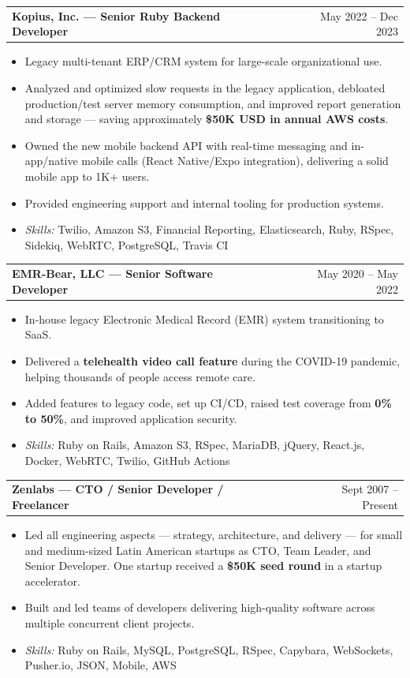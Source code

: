 \documentclass[a4paper,12pt]{article}
\makeatletter
\newcommand{\skillsfont}{\fontsize{9.6}{11.5}\selectfont}
\newenvironment{joblong}[2]
    {
    \begin{tabularx}{\linewidth}{@{}l X r@{}}
    \textbf{#1} & \hfill &  #2 \\[3.75pt]
    \end{tabularx}
    \begin{minipage}[t]{\linewidth}
    \begin{itemize}[nosep,after=\strut, leftmargin=1em, itemsep=3pt,label=--]
    }
    {
    \end{itemize}
    \end{minipage}
    }
\makeatother
\begin{document}
\begin{joblong}{Kopius, Inc. --- Senior Ruby Backend Developer}{May 2022 -- Dec 2023}
\item Legacy multi-tenant ERP/CRM system for
      large-scale organizational use.
\item Analyzed and optimized slow requests in the legacy application, debloated
      production/test server memory consumption, and improved report generation
      and storage --- saving approximately \textbf{\$50K USD in annual AWS costs}.
\item Owned the new mobile backend API with real-time messaging and in-app/native
      mobile calls (React Native/Expo integration), delivering a solid mobile app
      to 1K+ users.
\item Provided engineering support and internal tooling for production systems.
\par\vspace{6pt}\item[]\skillsfont\textit{Skills:} Twilio, Amazon S3, Financial Reporting, Elasticsearch, Ruby, RSpec,
      Sidekiq, WebRTC, PostgreSQL, Travis CI
\end{joblong}

\begin{joblong}{EMR-Bear, LLC --- Senior Software Developer}{May 2020 -- May 2022}
\item In-house legacy Electronic Medical Record
      (EMR) system transitioning to SaaS.
\item Delivered a \textbf{telehealth video call feature} during the COVID-19
      pandemic, helping thousands of people access remote care.
\item Added features to legacy code, set up CI/CD, raised test coverage from
      \textbf{0\% to 50\%}, and improved application security.
\par\vspace{6pt}\item[]\skillsfont\textit{Skills:} Ruby on Rails, Amazon S3, RSpec, MariaDB, jQuery, React.js, Docker,
      WebRTC, Twilio, GitHub Actions
\end{joblong}

\begin{joblong}{Zenlabs --- CTO / Senior Developer / Freelancer}{Sept 2007 -- Present}
\item Led all engineering aspects --- strategy, architecture,
      and delivery --- for small and medium-sized Latin American startups as CTO,
      Team Leader, and Senior Developer. One startup received a \textbf{\$50K seed
      round} in a startup accelerator.
\item Built and led teams of developers delivering high-quality software across
      multiple concurrent client projects.
\par\vspace{6pt}\item[]\skillsfont\textit{Skills:} Ruby on Rails, MySQL, PostgreSQL, RSpec, Capybara, WebSockets,
      Pusher.io, JSON, Mobile, AWS
\end{joblong}
\end{document}
